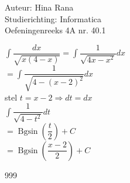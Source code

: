 \documentclass[a4paper]{article}
\newcommand{\dint}{\displaystyle\int}
\begin{document}
\noindent \large Auteur: Hina Rana \\
\noindent \large Studierichting: Informatica\\
\noindent \large Oefeningenreeks 4A nr. 40.1\\

\medskip

\normalsize

$ \dint \dfrac{dx}{\sqrt{x(4-x)}} = \dint \dfrac{1}{\sqrt{4x-x^2}} dx$ \\

$ = \dint \dfrac{1}{\sqrt{4-(x-2)^2}}dx$\\

stel $t = x-2 \Rightarrow dt =dx$\\

$ \dint \dfrac{1}{\sqrt{4-t^2}} dt$\\

$ =\operatorname{Bgsin} \left(\dfrac{t}{2}\right) + C$ \\

$ =\operatorname{Bgsin} \left(\dfrac{x-2}{2}\right) + C$\\


\begin{thebibliography}{999}
\end{thebibliography}
\end{document}

